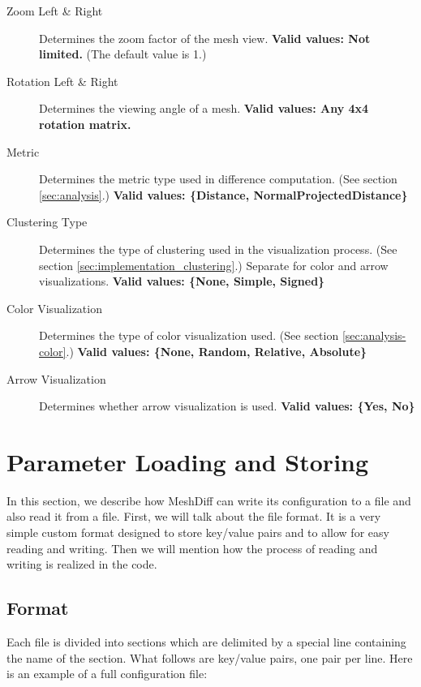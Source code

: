 \begin{description}
\item [Zoom Left \& Right] Determines the zoom factor of the mesh view. {\bf Valid values: Not limited.} (The default value is 1.)
\item [Rotation Left \& Right] Determines the viewing angle of a mesh. {\bf Valid values: Any 4x4 rotation matrix.}
\item [Metric] Determines the metric type used in difference computation. (See section \ref{sec:analysis}.) {\bf Valid values: \{Distance, NormalProjectedDistance\}}
\item [Clustering Type] Determines the type of clustering used in the visualization process. (See section \ref{sec:implementation_clustering}.) Separate for color and arrow visualizations. {\bf Valid values: \{None, Simple, Signed\}}
\item [Color Visualization] Determines the type of color visualization used. (See section \ref{sec:analysis-color}.) {\bf Valid values: \{None, Random, Relative, Absolute\}}
\item [Arrow Visualization] Determines whether arrow visualization is used. {\bf Valid values: \{Yes, No\}}
\end{description}

\section{Parameter Loading and Storing}
\label{sec:parameter_load_store}

In this section, we describe how MeshDiff can write its configuration to a file and also read it from a file. First, we will talk about the file format. It is a very simple custom format designed to store key/value pairs and to allow for easy reading and writing. Then we will mention how the process of reading and writing is realized in the code.

\subsection{Format}

Each file is divided into sections which are delimited by a special line containing the name of the section. What follows are key/value pairs, one pair per line. Here is an example of a full configuration file:

